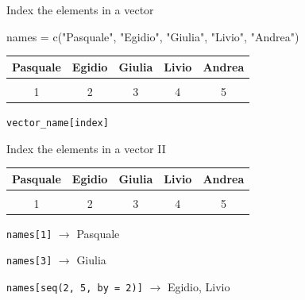 \documentclass[
  ignorenonframetext,
]{beamer}
\newenvironment{Shaded}{\begin{snugshade}}{\end{snugshade}}
\newcommand{\FunctionTok}[1]{\textcolor[rgb]{0.39,0.29,0.61}{#1}}
\newcommand{\NormalTok}[1]{\textcolor[rgb]{0.12,0.11,0.11}{#1}}
\newcommand{\OtherTok}[1]{\textcolor[rgb]{0.00,0.43,0.16}{#1}}
\newcommand{\StringTok}[1]{\textcolor[rgb]{0.75,0.01,0.01}{#1}}
\begin{document}
\begin{frame}[fragile]{Index the elements in a vector}
\protect\hypertarget{index-the-elements-in-a-vector}{}
\begin{Shaded}
\begin{Highlighting}[]
\NormalTok{names }\OtherTok{=} \FunctionTok{c}\NormalTok{(}\StringTok{"Pasquale"}\NormalTok{, }\StringTok{"Egidio"}\NormalTok{, }\StringTok{"Giulia"}\NormalTok{, }\StringTok{"Livio"}\NormalTok{, }\StringTok{"Andrea"}\NormalTok{)}
\end{Highlighting}
\end{Shaded}

\begin{table}
\centering
\begin{tabular}{p{2cm}p{2cm}p{2cm}p{2cm}p{2cm}}
\hline
\multicolumn{1}{|c|}{Pasquale} & \multicolumn{1}{|c|}{Egidio}& \multicolumn{1}{|c|}{Giulia} & \multicolumn{1}{|c|}{Livio} & \multicolumn{1}{|c|}{Andrea} \\\hline
& & & & \\

\multicolumn{1}{c}{1} & \multicolumn{1}{c}{2}& \multicolumn{1}{c}{3} & \multicolumn{1}{c}{4} & \multicolumn{1}{c}{5}\\
\end{tabular}
\end{table}

\pause

\vspace{5mm}

\centering

\texttt{vector\_name{[}index{]}}
\end{frame}

\begin{frame}[fragile]{Index the elements in a vector II}
\protect\hypertarget{index-the-elements-in-a-vector-ii}{}
\begin{table}
\centering
\begin{tabular}{p{2cm}p{2cm}p{2cm}p{2cm}p{2cm}}
\hline
\multicolumn{1}{|c|}{Pasquale} & \multicolumn{1}{|c|}{Egidio}& \multicolumn{1}{|c|}{Giulia} & \multicolumn{1}{|c|}{Livio} & \multicolumn{1}{|c|}{Andrea} \\\hline
& & & & \\

\multicolumn{1}{c}{1} & \multicolumn{1}{c}{2}& \multicolumn{1}{c}{3} & \multicolumn{1}{c}{4} & \multicolumn{1}{c}{5}\\
\end{tabular}
\end{table}

\centering
\pause

\texttt{names{[}1{]}} \(\rightarrow\) \pause Pasquale

\texttt{names{[}3{]}} \(\rightarrow\) \pause Giulia

\texttt{names{[}seq(2,\ 5,\ by\ =\ 2){]}} \(\rightarrow\) \pause Egidio,
Livio
\end{frame}
\end{document}

